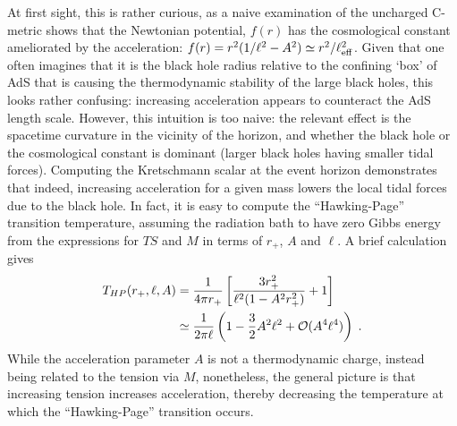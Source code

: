\documentclass[
twoside,
openright,
frontopenright
]{dmathesis}
\newcommand{\nn}{\nonumber}
\begin{document}
At first sight, this is rather curious, as a naive examination of the uncharged
C-metric shows that the Newtonian potential, $f(r)$ has the cosmological
constant ameliorated by the acceleration:
$f(r) = r^2 (1 / \ell^2 - A^2) \simeq r^2/\ell_{\rm eff}^2$. Given that one
often imagines that it is the black hole radius relative to the confining `box'
of AdS that is causing the thermodynamic stability of the large black holes,
this looks rather confusing: increasing acceleration appears to counteract the
AdS length scale. However, this intuition is too naive: the relevant effect is
the spacetime curvature in the vicinity of the horizon, and whether the black
hole or the cosmological constant is dominant (larger black holes having smaller
tidal forces). Computing the Kretschmann scalar at the event horizon
demonstrates that indeed, increasing acceleration for a given mass lowers the
local tidal forces due to the black hole.  In fact, it is easy to compute the
``Hawking-Page'' transition temperature, assuming the radiation bath to have
zero Gibbs energy from the expressions for $TS$ and $M$ in terms of $r_+$, $A$
and $\ell$. A brief calculation gives
\begin{align}
T_{HP} (r_+, \ell, A) &= \frac{1}{4\pi r_+ }\left [
\frac{ 3r_+^2}{\ell^2 ( 1- A^2 r_+^2) } + 1 \right ]\nn\\
& \simeq \frac{1}{2\pi \ell} \left ( 1 - \frac32 A^2 \ell^2 + {\cal{O}} (A^4 \ell^4) \right)
\;.
\end{align}
While the acceleration parameter $A$ is not a thermodynamic charge, instead
being related to the tension via $M$, nonetheless, the general picture is that
increasing tension increases acceleration, thereby decreasing the temperature at
which the ``Hawking-Page'' transition occurs.
\end{document}

